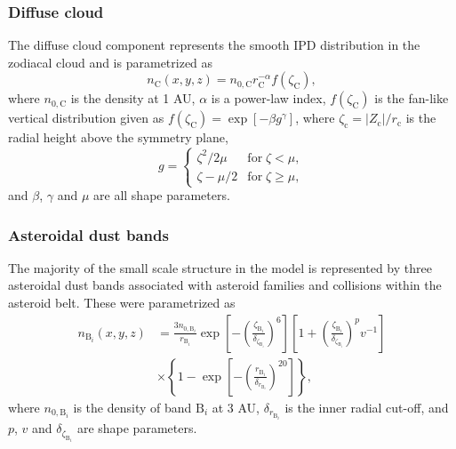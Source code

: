 \documentclass{aa}
\begin{document}
\subsubsection{Diffuse cloud}
The diffuse cloud component represents the smooth IPD distribution in the zodiacal cloud and is parametrized as
\begin{equation}
    n_\mathrm{C}(x,y,z)=n_{0, \mathrm{C}}r_\mathrm{C}^{-\alpha}f(\zeta_\mathrm{C}),
\end{equation}
where $n_{0, \mathrm{C}}$ is the density at 1 AU, $\alpha$ is a power-law index, $f(\zeta_\mathrm{C})$ is the fan-like vertical distribution given as $f(\zeta_\mathrm{C}) = \exp {\left[-\beta g^\gamma \right]}$, where $\zeta_\mathrm{c} = |Z_\mathrm{c}|/r_\mathrm{c}$ is the radial height above the symmetry plane, 
\begin{equation}
    g = \begin{cases}
        \zeta^2/2\mu & \mathrm{for}\; \zeta < \mu,\\
        \zeta - \mu/2 & \mathrm{for}\; \zeta \geq \mu,
    \end{cases}
\end{equation}
and  $\beta$, $\gamma$ and $\mu$ are all shape parameters.

\subsubsection{Asteroidal dust bands}
The majority of the small scale structure in the model is represented by three asteroidal dust bands associated with asteroid families and collisions within the asteroid belt. These were parametrized as 
\begin{align}
    n_{\mathrm{B}_i}(x,y,z) &= \frac{3 n_{0, \mathrm{B}_i}}{r_{\mathrm{B}_i}} \exp \left[-\left(\frac{\zeta_{\mathrm{B}_i}}{\delta_{\zeta_{\mathrm{B}_i}}}\right)^{6}\right]\left[1 + \left(\frac{\zeta_{\mathrm{B}_i}}{\delta_{\zeta_{\mathrm{B}_i}}}\right)^{p}v^{-1}\right] \\
    &\times\left\{1-\exp \left[-\left(\frac{r_{\mathrm{B}_i}}{\delta_{r_{\mathrm{B}_i}}}\right)^{20}\right]\right\},
\end{align}
where $n_{0, \mathrm{B}_i}$ is the density of band $\mathrm{B}_i$ at 3 AU, $\delta_{r_{\mathrm{B}_i}}$ is the inner radial cut-off, and $p$, $v$ and $\delta_{\zeta_{\mathrm{B}_i}}$ are shape parameters.
\end{document}
